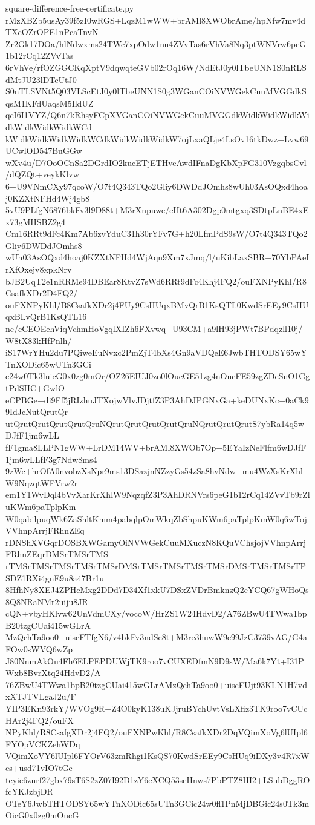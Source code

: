 \documentclass[11pt]{article}
\theoremstyle{definition}
\theoremstyle{remark}
\begin{document}
\begin{filecontents*}[overwrite]{square-difference-free-certificate.py}
rMzXBZb5usAy39f5zI0wRGS+LqzM1wWW+brAMl8XWObrAme/hpNfw7mv4dTXcOZrOPE1nPcaTnvN
Zr2Gk17DOa/hlNdwxms24TWc7xpOdw1nu4ZVvTas6rVhVa8Nq3ptWNVrw6peG1b12rCq12ZVvTas
6rVhVe/rfOZGGCKqXptV9dqwqteGVb02rOq16W/NdEtJ0y0lTbeUNN1S0nRLSdMtJU23lDTcUtJ0
S0nTLSVNt5Q03VLScEtJ0y0lTbeUNN1S0g3WGanCOiNVWGekCuuMVGGdkSqsM1KFdUaqsM5IldUZ
qcI6I1VYZ/Q6n7kRhsyFCpXVGanCOiNVWGekCuuMVGGdkWidkWidkWidkWidkWidkWidkWidkWCd
kWidkWidkWidkWidkWCdkWidkWidkWidkW7ojLxaQLje4LsOv16tkDwz+Lvw69UCwlOD547BuGGw
wXv4u/D7OoOCnSa2DGrdIO2kucETjETHveAwdIFnaDgKbXpFG310VzgqbsCvl/dQZQt+veykKlvw
6+U9VNmCXy97qcoW/O7t4Q343TQo2Gliy6DWDdJOmhs8wUh03AsOQxd4hoaj0KZXtNFHd4Wj4gb8
5vU9PLfgN6876bkFv3l9D88t+M3rXnpuwe/eHt6A302Dgp0mtgxq3SDtpLnBE4xEx73gMHSBZ2g4
Cm16RRt9dFc4Km7Ab6zvYduC31h30rYFv7G+h20LfmPdS9sW/O7t4Q343TQo2Gliy6DWDdJOmhs8
wUh03AsOQxd4hoaj0KZXtNFHd4WjAqn9Xm7xJmq/l/uKibLaxSBR+70YbPAeIrXfOxejv8xpkNrv
bJB2UqT2e1nRRMe94DBEar8KtvZ7sWd6RRt9dFc4Khj4FQ2/ouFXNPyKhl/R8CsafkXDr2D4FQ2/
ouFXNPyKhl/B8CsafkXDr2j4FUy9CsHUqxBMvQrB1KsQTL0KwdSrEEy9CsHUqxBLvQrB1KsQTL16
nc/cCEOEehViqVchmHoVgqlXIZh6FXvwq+U93CM+a9lH93jPWt7BPdqzll10j/W8tX83kHfPnlh/
iS17WrYHu2du7PQiweEuNvxc2PmZjT4bXs4Gn9aVDQeE6JwbTHTODSY65wYTnXODic65wUTn3GCi
c24w0Tk3luicG0x0zg0mOr/OZ26EIUJ0zo0lOucGE51zg4nOucFE59zgZDcSnO1GgtPdSHC+GwlO
eCPBGe+di9Ff5jRIzhuJTXojwVlvJDjtfZ3P3AhDJPGNxGa+keDUNxKc+0aCk99IdJcNutQrutQr
utQrutQrutQrutQrutQruNQrutQrutQrutQrutQruNQrutQrutQrutS7ybRa14q5wDJfF1jm6wLL
fF1gma8LLPN1gWW+LrDM14WV+brAMl8XWOb7Op+5EYaIzNeFlfm6wDJfF1jm6wLLfF3g7Ndw8ms4
9zWc+hrOfA0nvobzXsNpr9ms13DSazjnNZzyGs54zSa8hvNdw+mu4WzXsKrXhlW9NqzqtWFVrw2r
em1Y1WvDql4bVvXarKrXhlW9NqzqfZ3P3AhDRNVrs6peG1b12rCq14ZVvTb9rZluKWm6paTplpKm
W0qabilpuqWk6ZaShltKmm4pabqlpOmWkqZbShpuKWm6paTplpKmW0q6wTojVVhnpArrjFRhnZEq
rDNShXVGqrDOSBXWGamyOiNVWGekCuuMXuczN8KQuVChsjojVVhnpArrjFRhnZEqrDMSrTMSrTMS
rTMSrTMSrTMSrTMSrTMSrDMSrTMSrTMSrTMSrTMSrDMSrTMSrTMSrTPSDZ1RXi4gnE9u8a47Br1u
8HfhNy8XEJ4ZPHcMxg2DDd7D34Xf1xkU7DSxZVDrBmknzQ2eYCQ67gWHoQs8Q8NRaNMr2uiju8JR
cQN+vbyHKlvw62UnVdmCXy/vocoW/HrZS1W24HdvD2/A76ZBwU4TWwa1bpB20tzgCUai415wGLrA
MzQchTa9oo0+uiscFTfgN6/v4bkFv3ndSc8t+M3re3huwW9e99JzC3739vAG/G4aFOw0sWVQ6wZp
J80NnmAkOu4Fh6ELPEPDUWjTK9roo7vCUXEDfmN9D9sW/Ma6k7Yt+I31PWxb8BvrXtq24HdvD2/A
76ZBwU4TWwa1bpB20tzgCUai415wGLrAMzQchTa9oo0+uiscFUjt93KLN1H7vdxXTJTVLgaJ2u/F
YIP3EKn93rkY/WVOg9R+Z4O0kyK138uKJjruBYchUvtVsLXfiz3TK9roo7vCUcHAr2j4FQ2/ouFX
NPyKhl/R8CsafgXDr2j4FQ2/ouFXNPwKhl/R8CsafkXDr2DqVQimXoVg6lUIpl6FYOpVCKZehWDq
VQimXoVY6lUIpl6FYOrV63zmRhgi1KsQS70KwdSrEEy9CsHUq9iDXy3v4R7xWcs+usd71vIO7tGe
teyie6znrf27gbx79sT6S2zZ07I92D1zY6cXCQ53seHnws7PbPTZ8HI2+LSubDggROfcYKJzbjDR
OTeY6JwbTHTODSY65wYTnXODic65sUTn3GCic24w0fl1PnMjDBGic24s0Tk3mOicG0x0zg0mOucG

\end{filecontents*}
\end{document}

